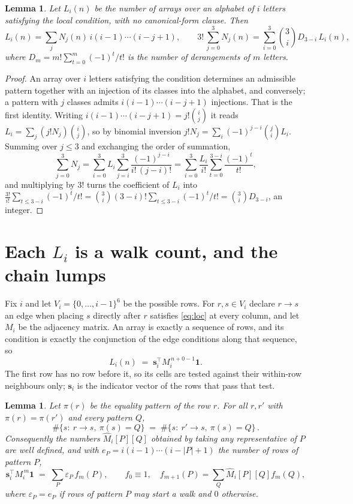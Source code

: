 \documentclass[11pt,a4paper]{article}
\theoremstyle{plain}
\newtheorem{lemma}[theorem]{Lemma}
\theoremstyle{definition}
\begin{document}
\begin{lemma}\label{lem:inv}
Let $L_i(n)$ be the number of arrays over an alphabet of $i$ letters satisfying the local
condition, with no canonical-form clause. Then
\[
L_i(n)=\sum_j N_j(n)\,i(i-1)\cdots(i-j+1),
\qquad
3!\,\sum_{j=0}^{3}N_j(n)=\sum_{i=0}^{3}\binom{3}{i}D_{3-i}\,L_i(n),
\]
where $D_m=m!\sum_{t=0}^{m}(-1)^t/t!$ is the number of derangements of $m$ letters.
\end{lemma}

\begin{proof}
An array over $i$ letters satisfying the condition determines an admissible pattern together
with an injection of its classes into the alphabet, and conversely; a pattern with $j$
classes admits $i(i-1)\cdots(i-j+1)$ injections. That is the first identity. Writing
$i(i-1)\cdots(i-j+1)=j!\binom{i}{j}$ it reads $L_i=\sum_j (j!N_j)\binom{i}{j}$, so by
binomial inversion $j!N_j=\sum_{i}(-1)^{j-i}\binom{j}{i}L_i$. Summing over
$j\le 3$ and exchanging the order of summation,
\[
\sum_{j=0}^{3}N_j=\sum_{i=0}^{3}L_i\sum_{j=i}^{3}\frac{(-1)^{j-i}}{i!\,(j-i)!}
=\sum_{i=0}^{3}\frac{L_i}{i!}\sum_{t=0}^{3-i}\frac{(-1)^t}{t!} ,
\]
and multiplying by $3!$ turns the coefficient of $L_i$ into
$\frac{3!}{i!}\sum_{t\le 3-i}(-1)^t/t!=\binom{3}{i}(3-i)!\sum_{t\le 3-i}(-1)^t/t!
=\binom{3}{i}D_{3-i}$, an integer.
\end{proof}

\section{Each $L_i$ is a walk count, and the chain lumps}

Fix $i$ and let $V_i=\{0,\dots,i-1\}^{6}$ be the possible rows. For $r,s\in V_i$
declare $r\to s$ an edge when placing $s$ directly after $r$ satisfies \eqref{eq:loc} at
every column, and let $M_i$ be the adjacency matrix. An array is exactly a sequence of
rows, and its condition is exactly the conjunction of the edge conditions along that
sequence, so
\[
L_i(n)\;=\;\mathbf{s}_i^{\!\top}M_i^{\,n+0-1}\mathbf{1} .
\]
The first row has no row before it, so its cells are tested
against their within-row neighbours only; $\mathbf{s}_i$ is the indicator vector of the
rows that pass that test.

\begin{lemma}\label{lem:lump}
Let $\pi(r)$ be the equality pattern of the row $r$. For all $r,r'$ with
$\pi(r)=\pi(r')$ and every pattern $Q$,
\[
\#\{s:\ r\to s,\ \pi(s)=Q\}\;=\;\#\{s:\ r'\to s,\ \pi(s)=Q\}\, .
\]
Consequently the numbers $\widehat M_i[P][Q]$ obtained by taking any representative of $P$
are well defined, and with $e_P=i(i-1)\cdots(i-|P|+1)$ the number of rows of pattern $P$,
\[
\mathbf{s}_i^{\!\top}M_i^{\,m}\mathbf{1}\;=\;\sum_P \varepsilon_P\,f_m(P),
\qquad f_0\equiv1,\quad f_{m+1}(P)=\sum_Q\widehat M_i[P][Q]f_m(Q),
\]
where $\varepsilon_P=e_P$ if rows of pattern $P$ may start a walk and $0$ otherwise.
\end{lemma}
\end{document}
